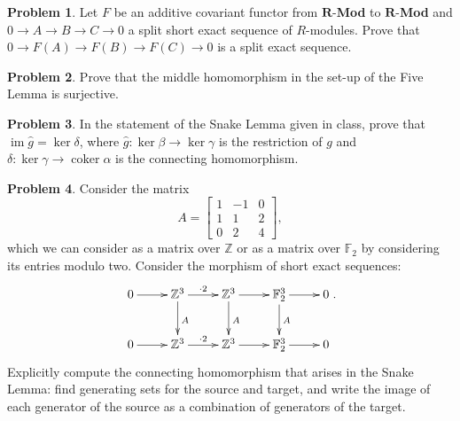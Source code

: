 \documentclass[11pt]{article}
\theoremstyle{definition}
\newtheorem{problem}{Problem}
\begin{document}
\begin{problem} Let $F$ be an additive covariant functor from $\mathbf R$-{\bf Mod} to $\mathbf R$-{\bf Mod} and $0\to A\to B\to C\to 0$ a split short exact sequence of $R$-modules.  Prove that $0\to F(A)\to F(B)\to F(C)\to 0$ is a split exact sequence.
\end{problem}

\begin{problem}
Prove that the middle homomorphism in the set-up of the Five Lemma is surjective.
\end{problem}

\begin{problem}  In the statement of the Snake Lemma given in class, prove that $\operatorname{im} \hat g=\ker \delta$, where $\hat g:\ker \beta\to \ker \gamma$ is the restriction of $g$ and $\delta:\ker \gamma\to \operatorname{coker} \alpha$ is the connecting homomorphism.
\end{problem}

\begin{problem} Consider the matrix
  \[ A = \begin{bmatrix} 1 & -1 & 0 \\ 1 & 1 & 2 \\ 0 & 2 & 4\end{bmatrix},\]
  which we can consider as a matrix over $\mathbb{Z}$ or as a matrix over $\mathbb{F}_2$ by considering its entries modulo two.
  Consider the morphism of short exact sequences:
\[ \xymatrix{ 0 \ar[r] & \mathbb{Z}^3 \ar[r]^{\cdot 2} \ar[d]^A & \mathbb{Z}^3 \ar[r]  \ar[d]^A & \mathbb{F}_2^3 \ar[r]  \ar[d]^A & 0 \\0 \ar[r] & \mathbb{Z}^3 \ar[r]^{\cdot 2}  & \mathbb{Z}^3 \ar[r]   & \mathbb{F}_2^3 \ar[r]   & 0 }.\]
Explicitly compute the connecting homomorphism that arises in the Snake Lemma: find generating sets for the source and target, and write the image of each generator of the source as a combination of generators of the target.
\end{problem}


 
\end{document}
